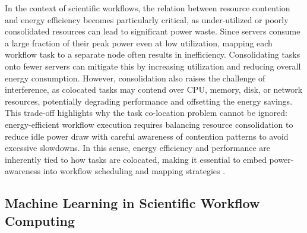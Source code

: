 In the context of scientific workflows, the relation between resource contention and energy efficiency becomes particularly critical, as under-utilized or poorly consolidated resources can lead to significant power waste. Since servers consume a large fraction of their peak power even at low utilization, mapping each workflow task to a separate node often results in inefficiency. Consolidating tasks onto fewer servers can mitigate this by increasing utilization and reducing overall energy consumption. However, consolidation also raises the challenge of interference, as colocated tasks may contend over CPU, memory, disk, or network resources, potentially degrading performance and offsetting the energy savings. This trade-off highlights why the task co-location problem cannot be ignored: energy-efficient workflow execution requires balancing resource consolidation to reduce idle power draw with careful awareness of contention patterns to avoid excessive slowdowns. In this sense, energy efficiency and performance are inherently tied to how tasks are colocated, making it essential to embed power-awareness into workflow scheduling and mapping strategies \cite{5644899} \cite{Lee2012}.

\subsection{Machine Learning in Scientific Workflow Computing}
\label{sec:background_ml}


